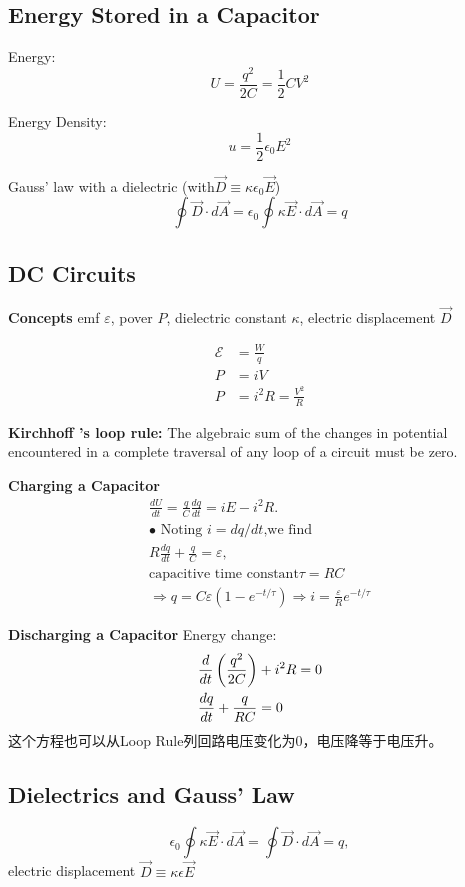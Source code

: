 \documentclass[11pt, a4paper]{article}
\begin{document}
\subsection{Energy Stored in a Capacitor}
Energy:$$U=\frac{q^2}{2C}=\frac12CV^2$$

Energy Density:
$$u=\frac12\epsilon_0E^2$$

Gauss' law with a dielectric (with$\vec{D}\equiv\kappa\epsilon_0\vec{E}$)
$$\oint\vec{D}\cdot d\vec{A}=\epsilon_0\oint\kappa\vec{E}\cdot d\vec{A}=q$$
\subsection{DC Circuits}
\textbf{Concepts}
emf $\varepsilon$, pover $P$, dielectric constant $\kappa$, electric displacement $\vec{D}$

$$
\begin{aligned}\mathcal{E}&=\frac Wq\\P&=iV\\P&=i^2R=\frac{V^2}R\end{aligned}
$$

\textbf{Kirchhoff ’s loop rule:} The algebraic sum of the changes in
potential encountered in a complete traversal of any loop of a circuit must be zero.

\textbf{Charging a Capacitor}
$$\begin{gathered}
    \frac{dU}{dt}=\frac qC\frac{dq}{dt}=iE-i^2R. \\
    \bullet\text{ Noting }i=dq/dt\text{,we find} \\
    R\frac{dq}{dt}+\frac qC=\varepsilon, \\
    \text{capacitive time constant} \tau = RC\\
    \Rightarrow q = C\varepsilon(1-e^{-t/\tau})
    \Rightarrow i = \frac{\varepsilon}{R}e^{-t/\tau}
\end{gathered}$$

\textbf{Discharging a Capacitor}
Energy change:
$$\begin{aligned}&\frac d{dt}\left(\frac{q^2}{2C}\right) + i^2R = 0\\
    &\frac{dq}{dt} + \frac{q}{RC} = 0\end{aligned}\\$$
这个方程也可以从Loop Rule列回路电压变化为0，电压降等于电压升。
\subsection{Dielectrics and Gauss’ Law}    
$$\epsilon_0\oint\kappa\vec{E}\cdot d\vec{A}=\oint\vec{D}\cdot d\vec{A}=q,$$
electric displacement $\vec{D} \equiv \kappa\epsilon \vec{E}$
\end{document}
